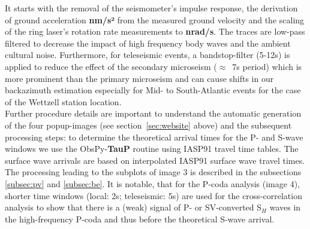 \documentclass[12pt,reqno,letter]{article} %
\begin{document}
It starts with the removal of the seismometer’s impulse response, the derivation of ground acceleration \textbf{nm/s²} from the measured ground velocity and the scaling of the ring laser's rotation rate measurements to \textbf{nrad/s}. The traces are low-pass filtered to decrease the impact of high frequency body waves and the ambient cultural noise. Furthermore, for teleseismic events, a bandstop-filter (5-12s) is applied to reduce the effect of the secondary microseism ($\approx$~7s period) which is more prominent than the primary microseism \citep{Hadziioannou2012} and can cause shifts in our backazimuth estimation especially for Mid- to South-Atlantic events for the case of the Wettzell station location.\\
Further procedure details are important to understand the automatic generation of the four popup-images (see section~\ref{sec:website} above) and the subsequent processing steps: 
to determine the theoretical arrival times for the P- and S-wave windows we use the ObsPy-\textbf{TauP} routine using IASP91 travel time tables. The surface wave arrivals are  based on interpolated IASP91 surface wave travel times. The processing leading to the subplots of image 3 is described in the subsections \ref{subsec:pv} and \ref{subsec:be}.
It is notable, that for the P-coda analysis (image 4), shorter time windows (local: 2s; teleseismic: 5s) are used for the cross-correlation analysis to show that there is a (weak) signal of P- or SV-converted S$_H$ waves in the high-frequency P-coda and thus before the theoretical S-wave arrival.

%
\end{document}
